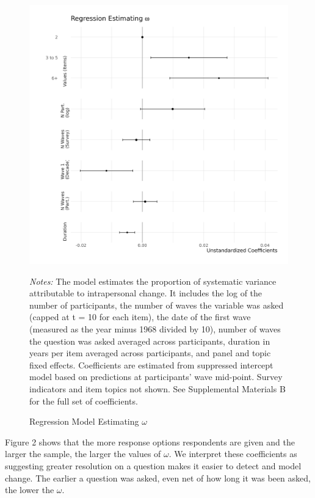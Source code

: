 \documentclass[
  12pt,
]{article}
\begin{document}
\begin{figure}[htp]
\begin{center}
\caption{Regression Model Estimating $\omega$}

\includegraphics[width=450px]{../figures/figure_2}

\end{center}
\footnotesize{\textit{Notes:} The model estimates the proportion of systematic variance attributable to intrapersonal change. It includes the log of the number of participants, the number of waves the variable was asked (capped at t = 10 for each item), the date of the first wave (measured as the year minus 1968 divided by 10), number of waves the question was asked averaged across participants, duration in years per item averaged across participants, and panel and topic fixed effects. Coefficients are estimated from suppressed intercept model based on predictions at participants' wave mid-point. Survey indicators and item topics not shown. See Supplemental Materials B for the full set of coefficients.}
\end{figure}

Figure 2 shows that the more response options respondents are given and
the larger the sample, the larger the values of \(\omega\). We interpret
these coefficients as suggesting greater resolution on a question makes
it easier to detect and model change. The earlier a question was asked,
even net of how long it was been asked, the lower the \(\omega\).
\end{document}

